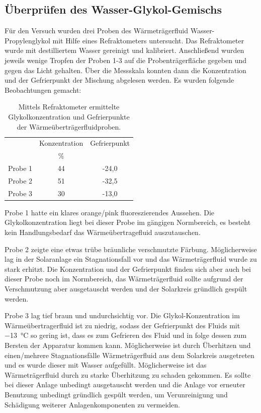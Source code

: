 \subsection{Überprüfen des Wasser-Glykol-Gemischs}

Für den Versuch wurden drei Proben des Wärmeträgerfluid Wasser-Propylenglykol mit Hilfe eines Refraktometers untersucht. Das Refraktometer wurde mit destilliertem Wasser gereinigt und kalibriert. Anschließend wurden jeweils wenige Tropfen der Proben 1-3 auf die Probenträgerfläche gegeben und gegen das Licht gehalten. Über die Messskala konnten dann die Konzentration und der Gefrierpunkt der Mischung abgelesen werden. Es wurden folgende Beobachtungen gemacht:

\begin{table}[H]
	\caption{Mittels Refraktometer ermittelte Glykolkonzentration und Gefrierpunkte der Wärmeüberträgerfluidproben.}
	\centering
	\begin{tabular}{lcc}
		\toprule
		& Konzentration  & Gefrierpunkt \\
		&\si{\percent}& \textcelsius\\
		\midrule
		Probe 1 &       44               &          -24,0           \\
		Probe 2 &       51            &            -32,5     \\
		Probe 3 &           30           &          -13,0       \\    
		\bottomrule  
	\end{tabular}
\end{table}

Probe 1 hatte ein klares orange/pink fluoreszierendes Aussehen. Die Glykolkonzentration liegt bei dieser Probe im gängigen Normbereich, es besteht kein Handlungsbedarf das Wärmeübertragefluid auszutauschen. 

Probe 2 zeigte eine etwas trübe bräunliche verschmutzte Färbung. Möglicherweise lag in der Solaranlage ein Stagnationsfall vor und das Wärmeträgerfluid wurde zu stark erhitzt. Die Konzentration und der Gefrierpunkt finden sich aber auch bei dieser Probe noch im Normbereich, das Wärmeträgerfluid sollte aufgrund der Verschmutzung aber ausgetauscht werden und der Solarkreis gründlich gespült werden.  

Probe 3 lag tief braun und undurchsichtig vor.  Die Glykol-Konzentration im Wärmeübertragerfluid ist zu niedrig, sodass der Gefrierpunkt des Fluids mit \SI{-13}{\celsius} so gering ist, dass es zum Gefrieren des Fluid und in folge dessen zum Bersten der Apparatur kommen kann. Möglicherweise ist durch Überhitzen und einen/mehrere Stagnationsfälle Wärmeträgerfluid aus dem Solarkreis ausgetreten und es wurde dieser mit Wasser aufgefüllt. Möglicherweise ist das Wärmeträgerfluid durch zu starke Überhitzung zu schaden gekommen. Es sollte bei dieser Anlage unbedingt ausgetauscht werden und die Anlage vor erneuter Benutzung unbedingt gründlich gespült werden, um Verunreinigung und Schädigung weiterer Anlagenkomponenten zu vermeiden. 